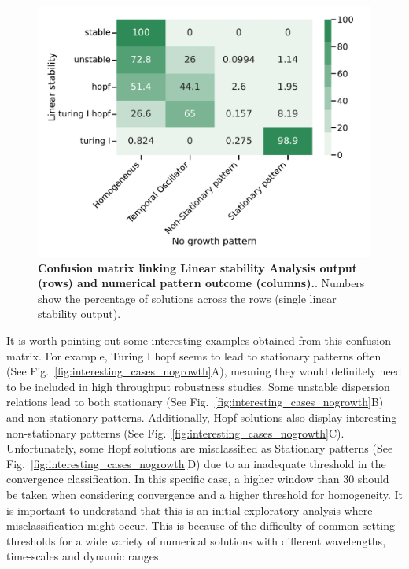 \begin{figure}[H] %
    \centering
    \includegraphics[width=1\textwidth]{chapters/Chapter 1/lsa_vs_numerical_confusion_variant0-11-12} %
    \caption{\textbf{Confusion matrix linking Linear stability Analysis output (rows) and numerical pattern outcome (columns).}. Numbers show the percentage of solutions across the rows (single linear stability output). }
    \label{fig:lsa_numerical_confusion} %
\end{figure}

It is worth pointing out some interesting examples obtained from this confusion matrix.
For example, Turing I hopf seems to lead to stationary patterns often (See Fig.~\ref{fig:interesting_cases_nogrowth}A), meaning they would definitely need to be included in high throughput robustness studies.
Some unstable dispersion relations lead to both stationary (See Fig.~\ref{fig:interesting_cases_nogrowth}B) and non-stationary patterns.
Additionally, Hopf solutions also display interesting non-stationary patterns (See Fig.~\ref{fig:interesting_cases_nogrowth}C).
Unfortunately, some Hopf solutions are misclassified as Stationary patterns (See Fig.~\ref{fig:interesting_cases_nogrowth}D) due to an inadequate threshold in the convergence classification.
In this specific case, a higher window than 30 should be taken when considering convergence and a higher threshold for homogeneity.
It is important to understand that this is an initial exploratory analysis where misclassification might occur.
This is because of the difficulty of common setting thresholds for a wide variety of numerical solutions with different wavelengths, time-scales and dynamic ranges.

